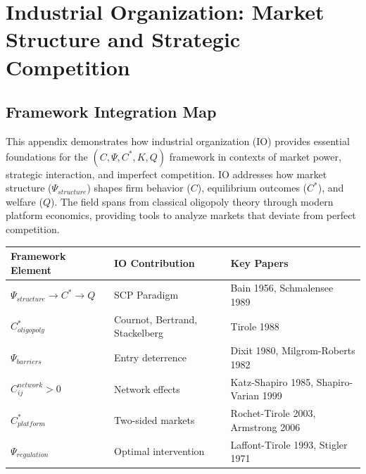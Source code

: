 \section{Industrial Organization: Market Structure and Strategic Competition}
\label{app:industrial-organization}

\subsection{Framework Integration Map}

This appendix demonstrates how industrial organization (IO) provides essential 
foundations for the $(C, \Psi, C^*, K, Q)$ framework in contexts of market 
power, strategic interaction, and imperfect competition. IO addresses how 
market structure ($\Psi_{structure}$) shapes firm behavior ($C$), equilibrium 
outcomes ($C^*$), and welfare ($Q$). The field spans from classical oligopoly 
theory through modern platform economics, providing tools to analyze markets 
that deviate from perfect competition.

\begin{center}
\renewcommand{\arraystretch}{1.4}
\begin{tabular}{|l|l|l|}
\hline
\textbf{Framework Element} & \textbf{IO Contribution} & \textbf{Key Papers} \\
\hline
$\Psi_{structure} \to C^* \to Q$ & SCP Paradigm & Bain 1956, Schmalensee 1989 \\
$C^*_{oligopoly}$ & Cournot, Bertrand, Stackelberg & Tirole 1988 \\
$\Psi_{barriers}$ & Entry deterrence & Dixit 1980, Milgrom-Roberts 1982 \\
$C_{ij}^{network} > 0$ & Network effects & Katz-Shapiro 1985, Shapiro-Varian 1999 \\
$C^*_{platform}$ & Two-sided markets & Rochet-Tirole 2003, Armstrong 2006 \\
$\Psi_{regulation}$ & Optimal intervention & Laffont-Tirole 1993, Stigler 1971 \\
\hline
\end{tabular}
\end{center}

